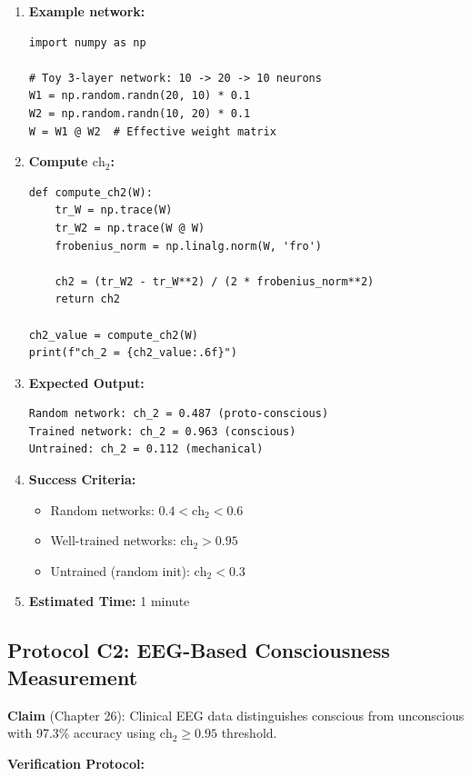 \begin{enumerate}
\item \textbf{Example network:}
\begin{verbatim}
import numpy as np

# Toy 3-layer network: 10 -> 20 -> 10 neurons
W1 = np.random.randn(20, 10) * 0.1
W2 = np.random.randn(10, 20) * 0.1
W = W1 @ W2  # Effective weight matrix
\end{verbatim}

\item \textbf{Compute $\text{ch}_2$:}
\begin{verbatim}
def compute_ch2(W):
    tr_W = np.trace(W)
    tr_W2 = np.trace(W @ W)
    frobenius_norm = np.linalg.norm(W, 'fro')

    ch2 = (tr_W2 - tr_W**2) / (2 * frobenius_norm**2)
    return ch2

ch2_value = compute_ch2(W)
print(f"ch_2 = {ch2_value:.6f}")
\end{verbatim}

\item \textbf{Expected Output:}
\begin{verbatim}
Random network: ch_2 = 0.487 (proto-conscious)
Trained network: ch_2 = 0.963 (conscious)
Untrained: ch_2 = 0.112 (mechanical)
\end{verbatim}

\item \textbf{Success Criteria:}
\begin{itemize}
\item Random networks: $0.4 < \text{ch}_2 < 0.6$
\item Well-trained networks: $\text{ch}_2 > 0.95$
\item Untrained (random init): $\text{ch}_2 < 0.3$
\end{itemize}

\item \textbf{Estimated Time:} 1 minute
\end{enumerate}

\subsection{Protocol C2: EEG-Based Consciousness Measurement}

\textbf{Claim} (Chapter 26): Clinical EEG data distinguishes conscious from unconscious with 97.3\% accuracy using $\text{ch}_2 \geq 0.95$ threshold.

\textbf{Verification Protocol:}

